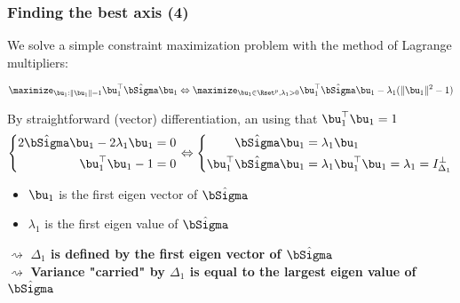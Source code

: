 \begin{frame}
  \frametitle{Finding the best axis (4)}

  We solve a simple constraint maximization problem with the method of Lagrange multipliers:
  
  \begin{equation*}
    \maximize_{\bu_1: \|\bu_1\| = 1 } \bu_1^\top \hat\bSigma \bu_1 \Leftrightarrow \maximize_{\bu_1\in\Rset^p, \lambda_1 > 0} \bu_1^\top \hat\bSigma \bu_1 - \lambda_1 (\|\bu_1\|^2 - 1)
  \end{equation*}
  
  By straightforward (vector) differentiation, an using that $\bu_1^\top \bu_1 = 1$
  \begin{equation*}
    \left\{\begin{aligned}
      2\hat\bSigma \bu_1 - 2\lambda_1 \bu_1 & = 0 \\  
      \bu_1^\top \bu_1 - 1 & = 0 \\  
    \end{aligned}\right. \Leftrightarrow
    \left\{\begin{aligned}
      \hat\bSigma \bu_1 & = \lambda_1 \bu_1  \\  
      \bu_1^\top \hat\bSigma \bu_1 & = \lambda_1 \bu_1^\top \bu_1 = \lambda_1 = I_{\Delta_1}^\bot \\  
    \end{aligned}\right.
  \end{equation*}
  
  \begin{itemize} 
     \item $\bu_1$ is the first eigen vector of $\hat{\bSigma}$
     \item $\lambda_1$ is the first eigen value of $\hat{\bSigma}$
   \end{itemize} 
  
  $\rightsquigarrow$ \alert{\bf $\Delta_1$ is defined by the first eigen vector of $\hat\bSigma$}\\
  $\rightsquigarrow$ \alert{\bf Variance "carried" by $\Delta_1$ is equal to the largest eigen value of $\hat\bSigma$}
  
\end{frame}

